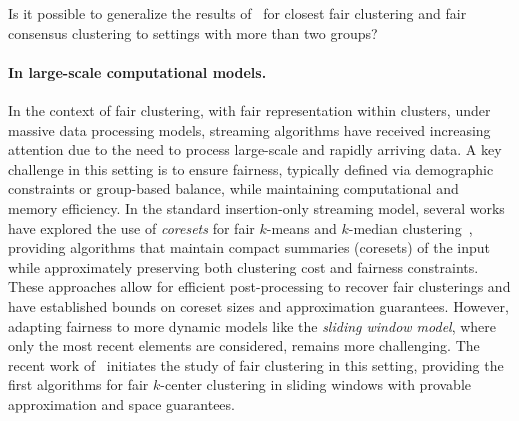 \begin{question}
    Is it possible to generalize the results of~\cite{chakraborty2025towards} for closest fair clustering and fair consensus clustering to settings with more than two groups?
\end{question}

\paragraph{In large-scale computational models.}
In the context of fair clustering, with fair representation within clusters, under massive data processing models, streaming algorithms have received increasing attention due to the need to process large-scale and rapidly arriving data. A key challenge in this setting is to ensure fairness, typically defined via demographic constraints or group-based balance, while maintaining computational and memory efficiency. In the standard insertion-only streaming model, several works have explored the use of \emph{coresets} for fair $k$-means and $k$-median clustering~\citep{DBLP:conf/waoa/0001SS19,DBLP:conf/nips/HuangJV19,DBLP:conf/icalp/BandyapadhyayFS21}, providing algorithms that maintain compact summaries (coresets) of the input while approximately preserving both clustering cost and fairness constraints. These approaches allow for efficient post-processing to recover fair clusterings and have established bounds on coreset sizes and approximation guarantees. However, adapting fairness to more dynamic models like the \emph{sliding window model}, where only the most recent elements are considered, remains more challenging. The recent work of~\citet{cohenfair25} initiates the study of fair clustering in this setting, providing the first algorithms for fair $k$-center clustering in sliding windows with provable approximation and space guarantees. 





